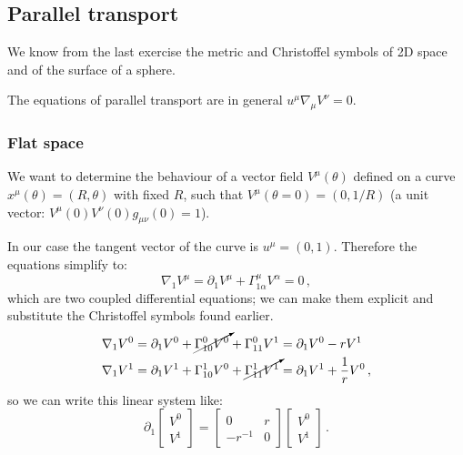 \documentclass[main.tex]{subfiles}
\begin{document}
\subsection{Parallel transport}

We know from the last exercise the metric and Christoffel symbols of 2D space and of the surface of a sphere.



The equations of parallel transport are in general \(u^{\mu }\nabla_{\mu }V^{\nu } = 0\).

\subsubsection{Flat space}

We want to determine the behaviour of a vector field \(V^{\mu }(\theta )\) defined on a curve \(x^{\mu }(\theta ) = (R, \theta)\) with fixed \(R\), such that \(V^{ \mu } (\theta = 0 ) = (0,1/R)\) (a unit vector: \(V^{\mu } (0) V^{\nu }(0) g_{\mu \nu }(0) = 1\)).

In our case the tangent vector of the curve is \(u^{\mu }= (0,1)\). Therefore the equations simplify to: 
%
\begin{equation}
  \nabla_{1}V^{\mu }= \partial_{1}V^{\mu }+\Gamma^{\mu }_{1 \alpha }V^{\alpha } = 0
\,,
\end{equation}
%
which are two coupled differential equations; we can make them explicit and substitute the Christoffel symbols found earlier. 
%
\begin{subequations}
\begin{align}
  \nabla_{1}V^{0} &= \partial_1 V^{0} + \cancelto{}{\Gamma^{0}_{10}V^{0}} + \Gamma^{0}_{11}V^{1}
  = \partial_1 V^{0} - r V^{1}  \\
  \nabla_{1}V^{1} &= \partial_1 V^{1} + \Gamma^{1}_{10}V^{0} + \cancelto{}{\Gamma^{1}_{11}V^{1}} 
  = \partial_{1}V^{1} + \frac{1}{r} V^{0}
\,,
\end{align}
\end{subequations}
%
so we can write this linear system like: 
%
\begin{equation}
  \partial_{1} \left[\begin{array}{c}
  V^{0} \\ 
  V^{1}
  \end{array}\right]
  =
  \left[\begin{array}{cc}
  0 & r \\ 
  -r^{-1} & 0
  \end{array}\right]
  \left[\begin{array}{c}
  V^{0} \\ 
  V^{1}
  \end{array}\right]
\,.
\end{equation}
%
\end{document}
